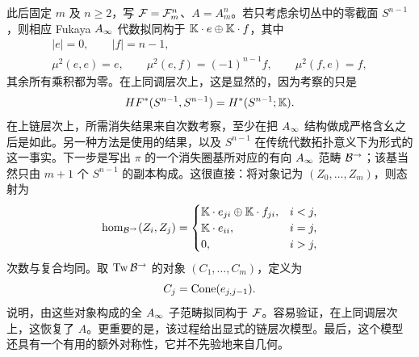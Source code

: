 此后固定 $m$ 及 $n\ge2$，写 $\mathcal F=\mathcal F_m^n$、$A=A_m^n$。若只考虑余切丛中的零截面 $S^{n-1}$，则相应 Fukaya $A_\infty$ 代数拟同构于 $\mathbb K\cdot e\oplus\mathbb K\cdot f$，其中
\begin{equation}\label{eq:20.4}
\begin{gathered}
|e|=0,\qquad |f|=n-1,\\
\mu^2(e,e)=e,\qquad\mu^2(e,f)=(-1)^{n-1}f,\qquad\mu^2(f,e)=f,
\end{gathered}
\end{equation}
其余所有乘积都为零。在上同调层次上，这是显然的，因为考察的只是
\[
HF^*(S^{n-1},S^{n-1})=H^*(S^{n-1};\mathbb K).
\]
在上链层次上，所需消失结果来自次数考察，至少在把 $A_\infty$ 结构做成严格含幺之后是如此。另一种方法是使用的结果，以及 $S^{n-1}$ 在传统代数拓扑意义下为形式的这一事实。下一步是写出 $\pi$ 的一个消失圈基所对应的有向 $A_\infty$ 范畴 $\mathcal B^\to$；该基当然只由 $m+1$ 个 $S^{n-1}$ 的副本构成。这很直接：将对象记为 $(Z_0,\ldots,Z_m)$，则态射为
\begin{equation}\label{eq:20.5}
\hom_{\mathcal B^\to}(Z_i,Z_j)=\begin{cases}
\mathbb K\cdot e_{ji}\oplus\mathbb K\cdot f_{ji},&i<j,\\
\mathbb K\cdot e_{ii},&i=j,\\
0,&i>j,
\end{cases}
\end{equation}
次数与复合均同。取 $\operatorname{Tw}\mathcal B^\to$ 的对象 $(C_1,\ldots,C_m)$，定义为
\begin{equation}\label{eq:20.6}
C_j=\operatorname{Cone}(e_{j,j-1}).
\end{equation}
说明，由这些对象构成的全 $A_\infty$ 子范畴拟同构于 $\mathcal F$。容易验证，在上同调层次上，这恢复了 $A$。更重要的是，该过程给出显式的链层次模型。最后，这个模型还具有一个有用的额外对称性，它并不先验地来自几何。

